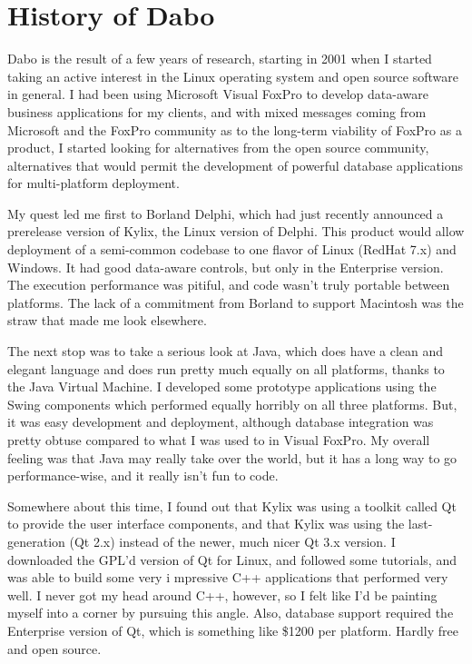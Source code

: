 
\chapter{History of Dabo}

Dabo is the result of a few years of research, starting in 2001 when I started taking 
an active interest in the Linux operating system and open source software in general. 
I had been using Microsoft Visual FoxPro to develop data-aware business applications 
for my clients, and with mixed messages coming from Microsoft and the FoxPro 
community as to the long-term viability of FoxPro as a product, I started looking for 
alternatives from the open source community, alternatives that would permit the 
development of powerful database applications for multi-platform deployment.

My quest led me first to Borland Delphi, which had just recently announced a 
prerelease version of Kylix, the Linux version of Delphi. This product would allow 
deployment of a semi-common codebase to one flavor of Linux (RedHat 7.x) and 
Windows. It had good data-aware controls, but only in the Enterprise version. The 
execution performance was pitiful, and code wasn't truly portable between platforms. 
The lack of a commitment from Borland to support Macintosh was the straw that 
made me look elsewhere.

The next stop was to take a serious look at Java, which does have a clean and 
elegant language and does run pretty much equally on all platforms, thanks to the 
Java Virtual Machine. I developed some prototype applications using the Swing 
components which performed equally horribly on all three platforms. But, it was easy 
development and deployment, although database integration was pretty obtuse 
compared to what I was used to in Visual FoxPro. My overall feeling was that Java 
may really take over the world, but it has a long way to go performance-wise, and 
it really isn't fun to code.

Somewhere about this time, I found out that Kylix was using a toolkit called Qt to 
provide the user interface components, and that Kylix was using the last-generation 
(Qt 2.x) instead of the newer, much nicer Qt 3.x version. I downloaded the GPL'd 
version of Qt for Linux, and followed some tutorials, and was able to build some very i
mpressive C++ applications that performed very well. I never got my head around 
C++, however, so I felt like I'd be painting myself into a corner by pursuing this 
angle. Also, database support required the Enterprise version of Qt, which is 
something like \$1200 per platform. Hardly free and open source.

